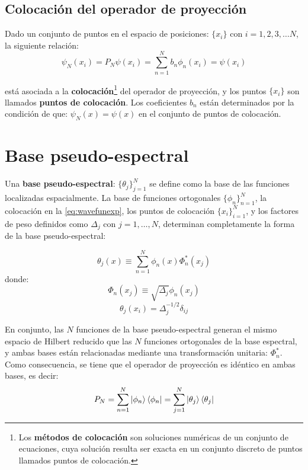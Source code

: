 \subsection{Colocación del operador de proyección}
Dado un conjunto de puntos en el espacio de posiciones: $\{x_i\}$ con $i=1,2,3,\dots N$, la siguiente relación:
\begin{equation}
  \label{eq:wavefunexp}
  \psi_N(x_i) = P_N\psi(x_i)=\sum_{n=1}^{N}b_n\phi_n(x_i) = \psi(x_i)
\end{equation}

está asociada a la \textbf{colocación}\footnote{Los \textbf{métodos de colocación} son soluciones numéricas de un conjunto de ecuaciones, cuya solución resulta ser exacta en un conjunto discreto de puntos llamados puntos de colocación.\cite{Tannor:2006}} del operador de proyección, y los puntos $\{x_i\}$ son llamados \textbf{puntos de colocación}. Los coeficientes $b_n$ están determinados por la condición de que: $\psi_N(x)=\psi(x)$ en el conjunto de puntos de colocación.


\section{Base pseudo-espectral}
Una \textbf{base pseudo-espectral}: $\{\theta_j\}_{j=1}^N$ se define como la base de las funciones localizadas espacialmente. La base de funciones ortogonales $\{\phi_n\}_{n=1}^N$, la colocación en la \autoref{eq:wavefunexp}, los puntos de colocación $\{x_i\}_{i=1}^N$, y los factores de peso definidos como $\Delta_j$ con $j=1,\dots,N$, determinan completamente la forma de la base pseudo-espectral:

\begin{equation}
  \label{eq:basepseudo}
  \theta_j(x) \equiv \sum_{n=1}^N\phi_n(x)\Phi_n^*(x_j)
\end{equation}
donde:
$$\Phi_n(x_j)\equiv \sqrt{\Delta_j}\phi_n(x_j)$$
$$\theta_j(x_i) = \Delta_j^{-1/2}\delta_{ij}$$


En conjunto, las $N$ funciones de la base pseudo-espectral generan el mismo espacio de Hilbert reducido que las $N$ funciones ortogonales de la base espectral, y ambas bases están relacionadas mediante una transformación unitaria: $\Phi_n^*$. Como consecuencia, se tiene que el operador de proyección es idéntico en ambas bases, es decir:
\begin{equation}
  \label{eq:proyecbases}
  P_N = \sum_{n=1}^N\ket{\phi_n}\bra{\phi_n}=\sum_{j=1}^N\ket{\theta_j}\bra{\theta_j}
\end{equation}

